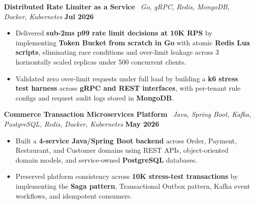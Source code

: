\documentclass[10pt,letterpaper]{article}
\begin{document}
\textbf{Distributed Rate Limiter as a Service}
\textbar\ \textit{Go, gRPC, Redis, MongoDB, Docker, Kubernetes}
\hfill \textbf{Jul 2026}
\begin{itemize}
  \item Delivered \textbf{sub-2ms p99 rate limit decisions at 10K RPS} by
  implementing \textbf{Token Bucket from scratch in Go} with atomic
  \textbf{Redis Lua scripts}, eliminating race conditions and over-limit
  leakage across 3 horizontally scaled replicas under 500 concurrent clients.
  \item Validated zero over-limit requests under full load by building a
  \textbf{k6 stress test harness} across \textbf{gRPC and REST interfaces},
  with per-tenant rule configs and request audit logs stored in \textbf{MongoDB}.
\end{itemize}

\textbf{Commerce Transaction Microservices Platform}
\textbar\ \textit{Java, Spring Boot, Kafka, PostgreSQL, Redis, Docker, Kubernetes}
\hfill \textbf{May 2026}
\begin{itemize}
  \item Built a \textbf{4-service Java/Spring Boot backend} across Order,
  Payment, Restaurant, and Customer domains using REST APIs, object-oriented
  domain models, and service-owned \textbf{PostgreSQL} databases.
  \item Preserved platform consistency across \textbf{10K stress-test transactions}
  by implementing the \textbf{Saga pattern}, Transactional Outbox pattern,
  Kafka event workflows, and idempotent consumers.
\end{itemize}
\vspace{2pt}
\end{document}
